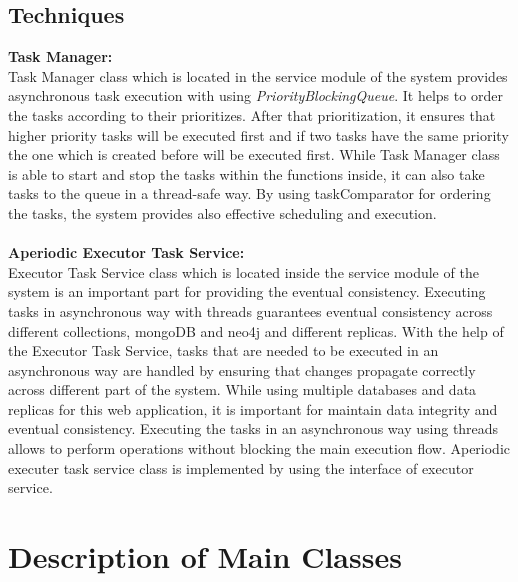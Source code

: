 \subsection*{Techniques}

\textbf{Task Manager:}\\
Task Manager class which is located in the service module of the system provides asynchronous task execution with using 
\textit{PriorityBlockingQueue}. It helps to order the tasks according to their prioritizes. 
After that prioritization, it ensures that higher priority tasks will be executed first and if two tasks have the 
same priority the one which is created before will be executed first. While Task Manager class is able to start and stop the tasks within the functions inside,
it can also take tasks to the queue in a thread-safe way. By using taskComparator for ordering the tasks,
the system provides also effective scheduling and execution. \\ \\
\textbf{Aperiodic Executor Task Service:}\\
Executor Task Service class which is located inside the service module of the system is an important part for providing the eventual consistency. Executing tasks in asynchronous way with threads guarantees
eventual consistency across different collections, mongoDB and neo4j and different replicas. 
With the help of the Executor Task Service, tasks that are needed to be executed in an asynchronous way are handled by ensuring that changes propagate correctly across different part of the system.
While using multiple databases and data replicas for this web application, it is important for maintain data integrity and eventual consistency.
Executing the tasks in an asynchronous way using threads allows to perform operations without blocking the main execution flow.
Aperiodic executer task service class is implemented by using the interface of executor service. 


\section{Description of Main Classes}

